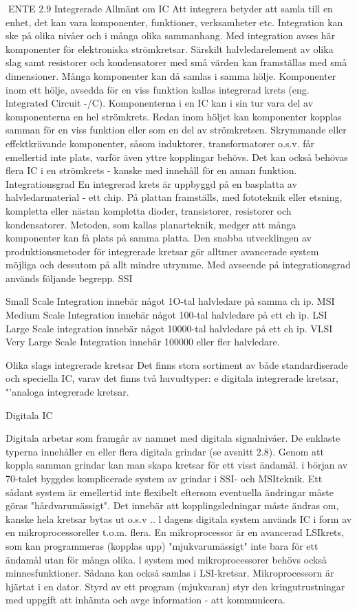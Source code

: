 \documentclass[a4paper,twoside,twocolumn,openright]{book}
\begin{document}
{{{{ENTE
2.9 Integrerade
Allmänt om IC
Att integrera betyder att samla till en enhet,
det kan vara komponenter, funktioner, verksamheter etc. Integration kan ske på olika
nivåer och i många olika sammanhang.
Med integration avses här komponenter
för elektroniska strömkretsar. Särskilt halvledarelement av olika slag samt resistorer
och kondensatorer med små värden kan
framställas med små dimensioner. Många
komponenter kan då samlas i samma hölje.
Komponenter inom ett hölje, avsedda för
en viss funktion kallas integrerad krets (eng.
lntegrated Circuit -/C).
Komponenterna i en IC kan i sin tur vara
del av komponenterna en hel strömkrets.
Redan inom höljet kan komponenter kopplas samman för en viss funktion eller som en
del av strömkretsen. Skrymmande eller effektkrävande komponenter, såsom induktorer, transformatorer o.s.v. får emellertid inte
plats, varför även yttre kopplingar behövs.
Det kan också behövas flera IC i en strömkrets - kanske med innehåll för en annan
funktion.
Integrationsgrad
En integrerad krets är uppbyggd på en basplatta av halvledarmaterial - ett chip. På
plattan framställs, med fototeknik eller etsning, kompletta eller nästan kompletta dioder, transistorer, resistorer och kondensatorer. Metoden, som kallas planarteknik, medger att många komponenter kan få plats på
samma platta.
Den snabba utvecklingen av produktionsmetoder för integrerade kretsar gör alltmer
avancerade system möjliga och dessutom
på allt mindre utrymme. Med avseende på
integrationsgrad används följande begrepp.
SSI

Small Scale Integration innebär något
1O-tal halvledare på samma ch ip.
MSI Medium Scale Integration innebär
något 100-tal halvledare på ett ch ip.
LSI Large Scale integration innebär något
10000-tal halvledare på ett ch ip.
VLSI Very Large Scale Integration innebär
100000 eller fler halvledare.

Olika slags integrerade kretsar
Det finns stora sortiment av både standardiserade och speciella IC, varav det finns två
huvudtyper:
e digitala integrerade kretsar,
"'analoga integrerade kretsar.

Digitala IC

Digitala
arbetar som framgår av namnet
med digitala signalnivåer. De enklaste typerna innehåller en eller flera digitala grindar
(se avsnitt 2.8). Genom att koppla samman
grindar kan man skapa kretsar för ett visst
ändamål. i början av 70-talet byggdes komplicerade system av grindar i SSI- och MSIteknik. Ett sådant system är emellertid inte
flexibelt eftersom eventuella ändringar måste göras "hårdvarumässigt". Det innebär att
kopplingsledningar måste ändras om, kanske hela kretsar bytas ut o.s.v ..
l dagens digitala system används IC i
form av en mikroprocessoreller t.o.m. flera.
En mikroprocessor är en avancerad LSIkrets, som kan programmeras (kopplas upp)
"mjukvarumässigt" inte bara för ett ändamål
utan för många olika. l system med mikroprocessorer behövs också minnesfunktioner. Sådana kan också samlas i LSI-kretsar.
Mikroprocessorn är hjärtat i en dator. Styrd
av ett program (mjukvaran) styr den kringutrustningar med uppgift att inhämta och avge
information - att kommunicera.

}}}}
\end{document}
